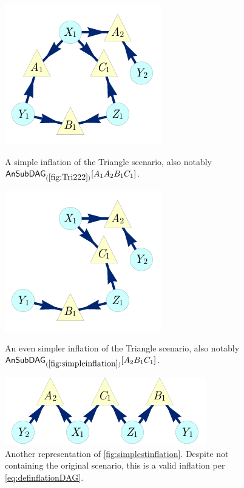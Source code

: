 \begin{figure}[t]
\centering
\begin{minipage}[t]{0.3\linewidth}
\centering
\includegraphics[scale=1]{broadcastingexamplenohighlight.pdf}
\caption{A simple inflation of the Triangle scenario, also notably $\ansubgraph[(\cref{fig:Tri222})]{A_1 A_2 B_1 C_1}$.}\label{fig:simpleinflation}
\end{minipage}\hfill
\begin{minipage}[t]{0.275\linewidth}
\centering
\includegraphics[scale=1]{nobroadcastingexamplenohighlight.pdf}
\caption{An even simpler inflation of the Triangle scenario, also notably $\ansubgraph[(\cref{fig:simpleinflation})]{A_2 B_1 C_1}$. }\label{fig:simplestinflation}
\end{minipage}
\hfill
\begin{minipage}[t]{0.325\linewidth}
\centering
\includegraphics[scale=1]{TriDagSubA2B1C1.pdf}
\caption{Another representation of \cref{fig:simplestinflation}. Despite not containing the original scenario, this is a valid inflation per \cref{eq:definflationDAG}.}\label{fig:TriDagSubA2B1C1}
\end{minipage}
\end{figure}

